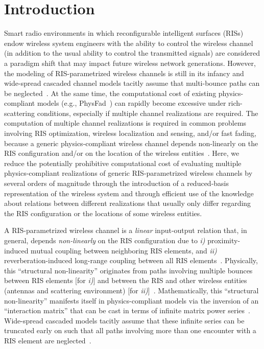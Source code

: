\documentclass[journal,12pt,onecolumn,draftclsnofoot]{IEEEtran}
\begin{document}
\section{Introduction}\label{sec_Introduction}


Smart radio environments in which reconfigurable intelligent surfaces (RISs) endow wireless system engineers with the ability to control the wireless channel (in addition to the usual ability to control the transmitted signals) are considered a paradigm shift that may impact future wireless network generations. However, the modeling of RIS-parametrized wireless channels is still in its infancy and wide-spread cascaded channel models tacitly assume that multi-bounce paths can be neglected~\cite{rabault2023tacit}. At the same time, the computational cost of existing physics-compliant models (e.g., PhysFad~\cite{PhysFad}) can rapidly become excessive under rich-scattering conditions, especially if multiple channel realizations are required. 
The computation of multiple channel realizations is required in common problems involving RIS optimization, wireless localization and sensing, and/or fast fading, because a generic physics-compliant wireless channel depends non-linearly on the RIS configuration and/or on the location of the wireless entities~\cite{rabault2023tacit,ChloeMag}.
Here, we reduce the potentially prohibitive computational cost of evaluating multiple physics-compliant realizations of generic RIS-parametrized wireless channels by several orders of magnitude through the introduction of a reduced-basis representation of the wireless system and through efficient use of the knowledge about relations between different realizations that usually only differ regarding the RIS configuration or the locations of some wireless entities.







A RIS-parametrized wireless channel is a \textit{linear} input-output relation that, in general, depends \textit{non-linearly} on the RIS configuration due to \textit{i)} proximity-induced mutual coupling between neighboring RIS elements, and \textit{ii)} reverberation-induced long-range coupling between all RIS elements~\cite{rabault2023tacit}. Physically, this ``structural non-linearity'' originates from paths involving multiple bounces between RIS elements [for \textit{i)}] and between the RIS and other wireless entities (antennas and scattering environment) [for \textit{ii)}]~\cite{rabault2023tacit}. 
Mathematically, this ``structural non-linearity'' manifests itself in physics-compliant models via the inversion of an ``interaction matrix'' that can be cast in terms of infinite matrix power series~\cite{rabault2023tacit}. Wide-spread cascaded models tacitly assume that these infinite series can be truncated early on such that all paths involving more than one encounter with a RIS element are neglected~\cite{rabault2023tacit}.
\end{document}
